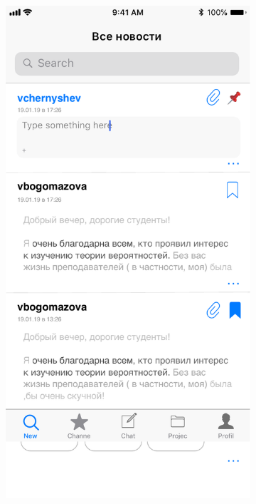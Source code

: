 \documentclass[a4paper,12pt,reqno]{article}
\begin{document}
\begin{figure}[h!]
\begin{subfigure}[b]{0.3\linewidth}
		\end{subfigure}
		\begin{subfigure}[b]{0.3\linewidth}
			\includegraphics[width=\linewidth]{../includes/prototype/2.pdf}
		\end{subfigure}

\end{figure}
\end{document}
